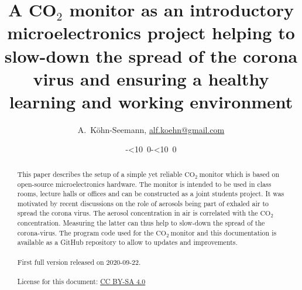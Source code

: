 \documentclass[12pt,a4paper]{article}
\def\myisodate{\leavevmode\hbox{\the\year-\twodigits\month-\twodigits\day}}
\def\twodigits#1{\ifnum#1<10 0\fi\the#1}
\newcommand{\coo}{\ensuremath{\mathrm{CO_2}~}}
\begin{document}
\title{A CO$_2$ monitor as an introductory microelectronics project helping to slow-down the spread of the corona virus and ensuring a healthy learning and working environment}

\author{A.~K\"{o}hn-Seemann, \href{mailto:alf.koehn@gmail.com}{alf.koehn@gmail.com}}
		
\date{\myisodate}

\maketitle

\begin{abstract}
This paper describes the setup of a simple yet reliable \coo monitor which is based on open-source microelectronics hardware. The monitor is intended to be used in class rooms, lecture halls or offices and can be constructed as a joint students project. It was motivated by recent discussions on the role of aerosols being part of exhaled air to spread the corona virus. The aerosol concentration in air is correlated with the \coo concentration. Measuring the latter can thus help to slow-down the spread of the corona-virus. The program code used for the \coo monitor and this documentation is available as a GitHub repository to allow to updates and improvements. 
\\ \quad \\ First full version released on 2020-09-22.
\\ \quad \\ License for this document: \href{https://creativecommons.org/licenses/by-sa/4.0/}{CC BY-SA 4.0}
\end{abstract}




\end{document}
